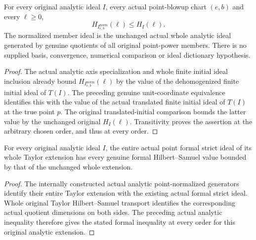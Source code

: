 \begin{theorem}
\label{hir:actual-analytic-point-normalized-bennett-all-orders}
\leanok
For every original analytic ideal $I$, every actual point-blowup chart
$(e,b)$ and every $\ell\ge0$,
\[
 H_{I^{\mathrm{norm}}_{e,b}}(\ell)\le H_I(\ell).
\]
The normalized member ideal is the unchanged actual whole analytic
ideal generated by genuine quotients of all original point-power members.
There is no supplied basis, convergence, numerical comparison or ideal
dictionary hypothesis.
\end{theorem}
\begin{proof}
The actual analytic axis specialization and whole finite initial ideal
inclusion already bound $H_{I^{\mathrm{norm}}_{e,b}}(\ell)$ by the value
of the dehomogenized finite initial ideal of $T(I)$. The preceding
genuine unit-coordinate equivalence identifies this with the value of
the actual translated finite initial ideal of $T(I)$ at the true point
$p$. The original translated-initial comparison bounds the latter value
by the unchanged original $H_I(\ell)$. Transitivity proves the assertion
at the arbitrary chosen order, and thus at every order.
\end{proof}

\begin{theorem}
\label{hir:actual-analytic-extension-point-formal-strict-bennett}
\leanok
For every original analytic ideal $I$, the entire actual point formal
strict ideal of its whole Taylor extension has every genuine formal
Hilbert--Samuel value bounded by that of the unchanged whole extension.
\end{theorem}
\begin{proof}
The internally constructed actual analytic point-normalized generators
identify their entire Taylor extension with the existing actual formal
strict ideal. Whole original Taylor Hilbert--Samuel transport identifies
the corresponding actual quotient dimensions on both sides. The
preceding actual analytic inequality therefore gives the stated formal
inequality at every order for this original analytic extension.
\end{proof}


